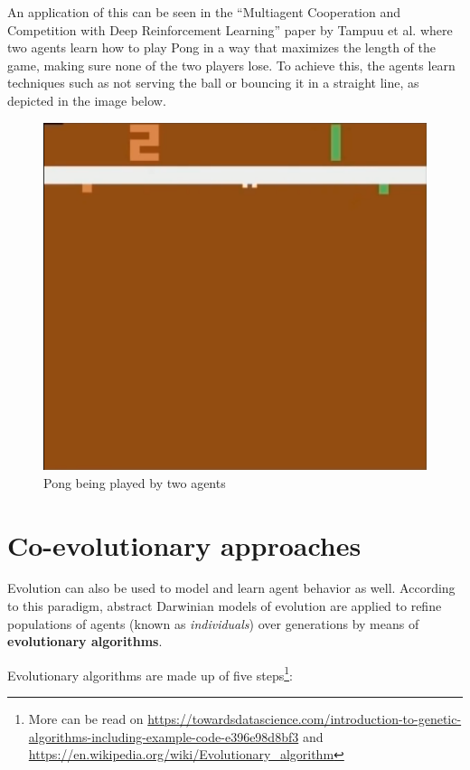 An application of this can be seen in the ``Multiagent Cooperation and Competition with Deep Reinforcement Learning'' paper by Tampuu et al. \cite{DBLP:journals/corr/TampuuMKKKAAV15} where two agents learn how to play Pong in a way that maximizes the length of the game, making sure none of the two players lose. To achieve this, the agents learn techniques such as not serving the ball or bouncing it in a straight line, as depicted in the image below.

\begin{figure}
    \centering
    \includegraphics[scale=0.35]{Images/Chapter 9/multiagent-pong.png}
    \caption{Pong being played by two agents}
    \label{fig:ch9-multiagentpong}
\end{figure}

\section{Co-evolutionary approaches}
Evolution can also be used to model and learn agent behavior as well. According to this paradigm, abstract Darwinian models of evolution are applied to refine populations of agents (known as \textit{individuals}) over generations by means of \textbf{evolutionary algorithms}. 

Evolutionary algorithms are made up of five steps\footnote{More can be read on \url{https://towardsdatascience.com/introduction-to-genetic-algorithms-including-example-code-e396e98d8bf3} and \url{https://en.wikipedia.org/wiki/Evolutionary_algorithm}}:

